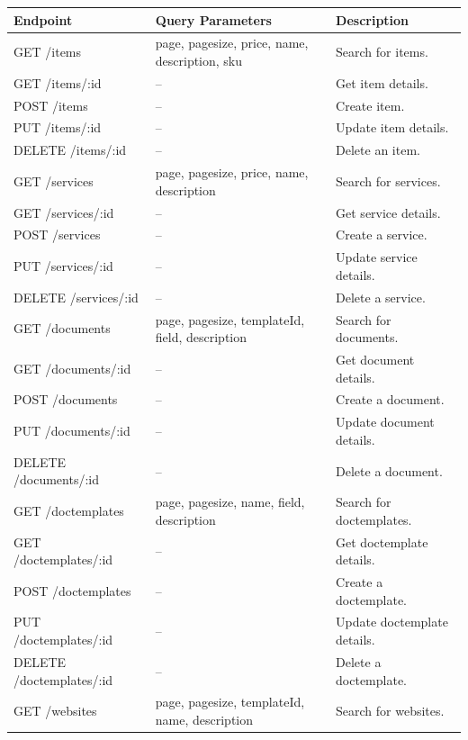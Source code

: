 \documentclass{article}
\begin{document}
\begin{table}
    \centering
    \begin{tabular}{|l|p{4.5cm}|l|}\hline
        Endpoint & Query Parameters & Description\\\hline\hline
         GET /items & page, pagesize, price, name, description, sku & Search for items. \\\hline
         GET /items/:id & -- & Get item details. \\\hline
         POST /items & -- & Create item. \\\hline
         PUT /items/:id & -- & Update item details. \\\hline
         DELETE /items/:id & -- & Delete an item. \\\hline
         GET /services & page, pagesize, price, name, description & Search for services. \\\hline
         GET /services/:id & -- & Get service details. \\\hline
         POST /services & -- & Create a service. \\\hline
         PUT /services/:id & -- & Update service details. \\\hline
         DELETE /services/:id & -- & Delete a service. \\\hline
         GET /documents & page, pagesize, templateId, field, description & Search for documents. \\\hline
         GET /documents/:id & -- & Get document details. \\\hline
         POST /documents & -- & Create a document. \\\hline
         PUT /documents/:id & -- & Update document details. \\\hline
         DELETE /documents/:id & -- & Delete a document. \\\hline
         GET /doctemplates & page, pagesize, name, field, description & Search for doctemplates. \\\hline
         GET /doctemplates/:id & -- & Get doctemplate details. \\\hline
         POST /doctemplates & -- & Create a doctemplate. \\\hline
         PUT /doctemplates/:id & -- & Update doctemplate details. \\\hline
         DELETE /doctemplates/:id & -- & Delete a doctemplate. \\\hline
         GET /websites & page, pagesize, templateId, name, description & Search for websites. \\\hline

\end{tabular}
\end{table}
\end{document}

